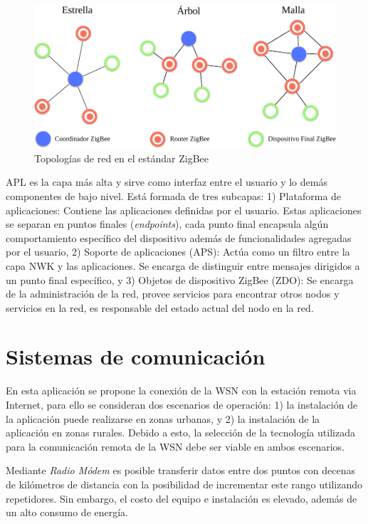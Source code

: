 \begin{figure}
	\centering
	\includegraphics[scale=0.73]{capitulo_2_imgs/topologias_zigbee.pdf}
	\caption{Topologías de red en el estándar ZigBee}
	\label{fig:topologias_zigbee}
\end{figure}

APL es la capa más alta y sirve como interfaz entre el usuario y lo demás componentes de bajo nivel. Está formada de tres subcapas: 1) Plataforma de aplicaciones: Contiene las aplicaciones definidas por el usuario. Estas aplicaciones se separan en puntos finales (\textit{endpoints}), cada punto final encapsula algún comportamiento específico del dispositivo además de funcionalidades agregadas por el usuario, 2) Soporte de aplicaciones (APS): Actúa como un filtro entre la capa NWK y las aplicaciones. Se encarga de distinguir entre mensajes dirigidos a un punto final específico, y 3) Objetos de dispositivo ZigBee (ZDO): Se encarga de la administración de la red, provee servicios para encontrar otros nodos y servicios en la red, es responsable del estado actual del nodo en la red. 

\section{Sistemas de comunicaci\'on}

En esta aplicación se propone la conexión de la WSN con la estación remota via Internet, para ello se consideran dos escenarios de operación: 1) la instalación de la aplicación puede realizarse en zonas urbanas, y 2) la instalación de la aplicación en zonas rurales. Debido a esto, la selección de la tecnología utilizada para la comunicación remota de la WSN debe ser viable en ambos escenarios. 

Mediante \textit{Radio Módem} es posible transferir datos entre dos puntos con decenas de kilómetros de distancia con la posibilidad de incrementar este rango utilizando repetidores. Sin embargo, el costo del equipo e instalación es elevado, además de un alto consumo de energía. 

